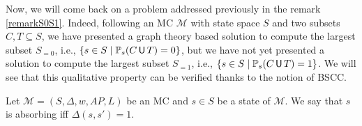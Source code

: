 Now, we will come back on a problem addressed previously in the remark \ref{remarkS0S1}. Indeed, following an MC $\mathcal{M}$ with state space $S$ and two subsets $C, T \subseteq S$, we have presented a graph theory based solution to compute the largest subset $S_{=0}$, i.e., $\{s \in S \; | \; \mathbb{P}_s(C \,\text{\sffamily U}\, T) = 0\}$, but we have not yet presented a solution to compute the largest subset $S_{=1}$, i.e., $\{s \in S \; | \; \mathbb{P}_s(C \,\text{\sffamily U}\, T) = 1\}$.
We will see that this qualitative property can be verified thanks to the notion of BSCC.

\begin{notation}
  Let $\mathcal{M}=(S, \Delta, w, AP, L)$ be an MC and $s \in S$ be a state of $\mathcal{M}$. We say that $s$ is absorbing iff $\Delta(s, s') = 1$.
\end{notation}

